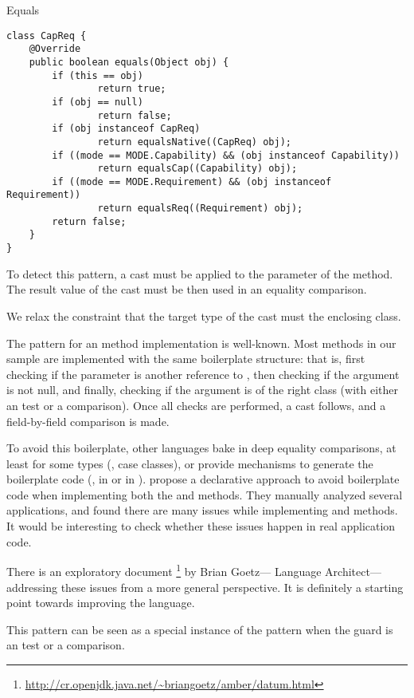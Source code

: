 \begin{pattern}{Equals}
\begin{verbatim}
class CapReq {
    @Override
    public boolean equals(Object obj) {
        if (this == obj)
                return true;
        if (obj == null)
                return false;
        if (obj instanceof CapReq)
                return equalsNative((CapReq) obj);
        if ((mode == MODE.Capability) && (obj instanceof Capability))
                return equalsCap((Capability) obj);
        if ((mode == MODE.Requirement) && (obj instanceof Requirement))
                return equalsReq((Requirement) obj);
        return false;
    }
}
\end{verbatim}

\detection{}
To detect this pattern,
a cast must be applied to the parameter of the  method.
The result value of the cast must be then used in an equality comparison.

We relax the constraint that the target type of the cast must the enclosing class.

\discussion{}
The pattern for an  method implementation is well-known.
Most  methods in our sample are implemented with the same boilerplate structure:
that is, first checking if the parameter is another reference to ,
then checking if the argument is not null,
and finally, checking if the argument is of the right class
(with either an  test or a  comparison).
Once all checks are performed, a cast follows, and a field-by-field comparison is made.

To avoid this boilerplate, other languages bake in deep equality comparisons,
at least for some types (\eg, \scala{} case classes),
or provide mechanisms to generate the boilerplate code (\eg, 
in \haskell{} or \code{\#[derive(Eq)]} in \rust{}).
\cite{vaziriDeclarativeObjectIdentity2007} propose a declarative approach to avoid boilerplate code when implementing
both the  and  methods.
They manually analyzed several applications, and found there are many issues while implementing  and  methods.
It would be interesting to check whether these issues happen in real application code.

There is an exploratory document%
\footnote{\url{http://cr.openjdk.java.net/\~briangoetz/amber/datum.html}}
by Brian Goetz---\java{} Language Architect---addressing these issues from a more general perspective.
It is definitely a starting point towards improving the \java{} language.


\related{}
This pattern can be seen as a special instance of the  pattern when the guard is an  test or a  comparison.

\end{pattern}